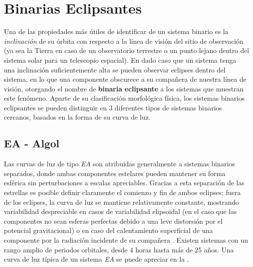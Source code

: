 \section{Binarias Eclipsantes}

Una de las propiedades más útiles de identificar de un sistema binario es
la \textit{inclinación} de su órbita con respecto a la línea de visión
del sitio de observación (ya sea la Tierra en caso de un observatorio
terrestre o un punto lejano dentro del sistema solar para un telescopio
espacial). En dado caso que un sistema tenga una inclinación suficientemente
alta se pueden observar eclipses dentro del sistema, en lo que una componente
obscurece a su compañera de nuestra línea de visión, otorgando el nombre de 
\textbf{binaria eclipsante} a los sistemas que muestran este fenómeno. 
Aparte de su clasificación morfológica física, los sistemas binarios eclipsantes
se pueden distinguir en 3 diferentes tipos de sistemas binarios cercanos,
basados en la forma de su curva de luz.

\subsection{EA - Algol}

Las curvas de luz de tipo \textit{EA} son atribuidas generalmente a sistemas
binarios separados, donde ambas componentes estelares pueden mantener su forma
esférica sin perturbaciones a escalas apreciables. Gracias a esta separación de
las estrellas es posible definir claramente el comienzo y fin de ambos eclipses;
fuera de los eclipses, la curva de luz se mantiene relativamente constante,
mostrando variabilidad despreciable en casos de variabilidad elipsoidal (en el
caso que las componentes no sean esferas perfectas debido a una leve distorsión
por el potencial gravitacional) o en caso del calentamiento superficial de una
componente por la radiación incidente de su compañera
\autocite{samus_gcvs_variable_types_2016}. Existen sistemas con un rango amplio
de periodos orbitales, desde 4 horas hasta más de 25 años. Una curva de luz
típica de un sistema \textit{EA} se puede apreciar en la
.

